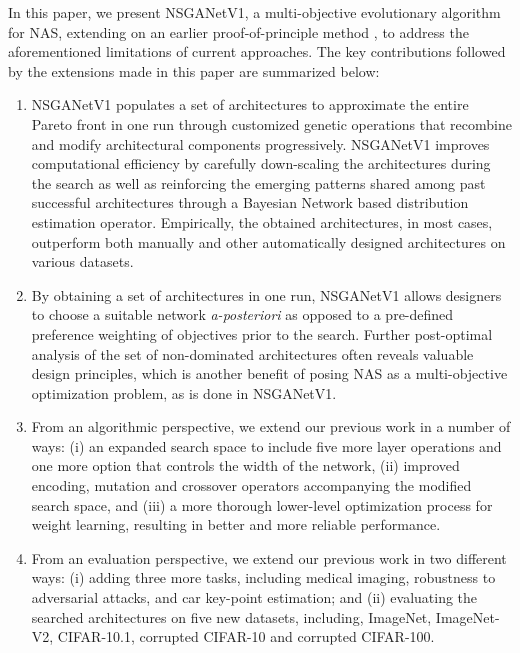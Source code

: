 \documentclass[journal]{IEEEtran}
\def\ourmethod{NSGANetV1}
\theoremstyle{definition}
\theoremstyle{remark}
\begin{document}
In this paper, we present \ourmethod{}, a multi-objective evolutionary algorithm for NAS, {extending on an earlier proof-of-principle method \cite{lu2019nsga},} to address the aforementioned limitations of current approaches. The key contributions followed by the extensions made in this paper are summarized below:
\begin{enumerate}
    
    \item \ourmethod{} populates a set of architectures to approximate the entire Pareto front in one run through customized genetic operations that recombine and modify architectural components  progressively. \ourmethod{} improves computational efficiency by carefully down-scaling the architectures during the search as well as reinforcing the emerging patterns shared among past  successful architectures through a Bayesian Network based distribution estimation operator. Empirically, the obtained architectures, in most cases, outperform both manually and other automatically designed architectures on various datasets.
    


    \item {By obtaining a set of architectures in one run, \ourmethod{} allows designers to choose a suitable network \emph{a-posteriori} as opposed to a pre-defined preference weighting of objectives prior to the search. Further post-optimal analysis of the set of non-dominated architectures often reveals valuable design principles, which is another benefit of posing NAS as a multi-objective optimization problem, as is done in \ourmethod{}}.
    
    \item {From an algorithmic perspective, we extend our previous work \cite{lu2019nsga} in a number of ways: (i) an expanded search space to include five more layer operations and one more option that controls the width of the network, (ii) improved encoding, mutation and crossover operators accompanying the modified search space, and (iii) a more thorough lower-level optimization process for weight learning, resulting in better and more reliable performance.}
    
    \item {From an evaluation perspective, we extend our previous work \cite{lu2019nsga} in two different ways: (i) adding three more tasks, including medical imaging, robustness to adversarial attacks, and car key-point estimation; and (ii) evaluating the searched architectures on five new datasets, including, ImageNet, ImageNet-V2, CIFAR-10.1, corrupted CIFAR-10 and corrupted CIFAR-100.}
    








\end{enumerate}
\end{document}
